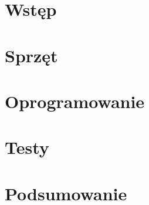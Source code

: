 \chapter{Wstęp}


%

%
%
\chapter{Sprzęt}


\chapter{Oprogramowanie}


\chapter{Testy}


\chapter{Podsumowanie}
\label{ch:podsumowanie}

